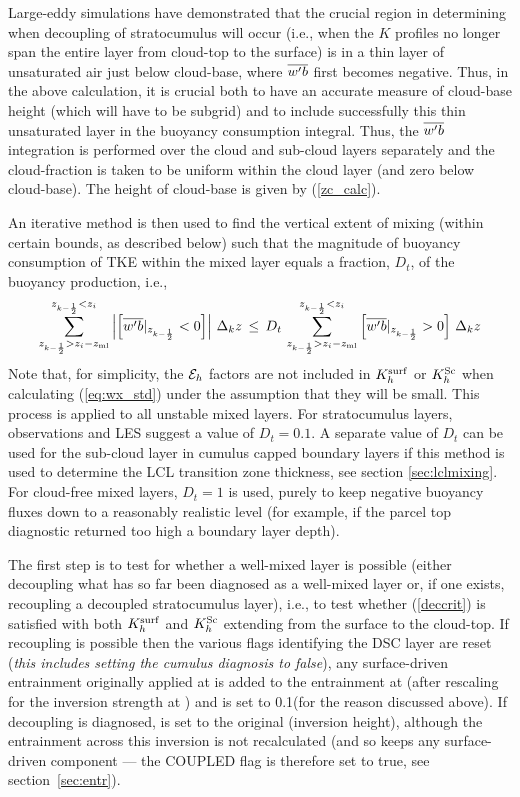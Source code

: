 \documentclass{UMDP_article}
\begin{document}
Large-eddy simulations have demonstrated that the crucial region in
determining when decoupling of stratocumulus will occur (\mbox{i.e.},
when the $K$ profiles no longer span the entire layer from cloud-top
to the surface) is in a thin layer of unsaturated air just below
cloud-base, where $\overline{w'b}$ first becomes negative.  Thus, in the above
calculation, it is crucial both to have an accurate measure of
cloud-base height (which will have to be subgrid) and to include
successfully this thin unsaturated layer in the buoyancy consumption
integral.  Thus, the $\overline{w'b}$ integration is performed over the cloud and
sub-cloud layers separately and the cloud-fraction is taken to be
uniform within the cloud layer (and zero below cloud-base).  The
height of cloud-base is given by (\ref{zc_calc}).

An iterative method is then used to find the vertical extent of mixing
(within certain bounds, as described below) such that the magnitude of
buoyancy consumption of TKE within the mixed layer equals a fraction,
$D_t$, of the buoyancy production, \mbox{i.e.},
\begin{equation}
  \sum_{z_{k-\frac{1}{2}} > z_i-z_{\rm ml}}^{z_{k-\frac{1}{2}} < z_i}
  \left|\left[ \overline{w'b}|_{z_{k-\frac{1}{2}}}<0 \right]\right| \, \Delta_k z \, 
  \leq \, D_t \, 
  \sum_{z_{k-\frac{1}{2}} > z_i-z_{\rm ml}}^{z_{k-\frac{1}{2}} < z_i}
  \left[ \overline{w'b}|_{z_{k-\frac{1}{2}}}>0 \right] \, \Delta_k z
  \label{deccrit}
\end{equation} 
Note that, for simplicity, the ${\cal E}_h$ factors are not included
in $K_h^{\rm surf}$ or $K_h^{\rm Sc}$ when calculating (\ref{eq:wx_std}) under the
assumption that they will be small.  This process is applied to all
unstable mixed layers.  For stratocumulus layers, observations and LES
suggest a value of $D_t=0.1$.  A separate value of $D_t$ can be used for 
the sub-cloud layer in cumulus capped boundary layers if this method is 
used to determine the LCL transition zone thickness, see 
section \ref{sec:lclmixing}.  For cloud-free mixed layers, $D_t=1$ is
used, purely to keep negative buoyancy fluxes down to a reasonably
realistic level (for example, if the parcel top diagnostic returned
too high a boundary layer depth).  

The first step is to test for whether a well-mixed layer is possible
(either decoupling what has so far been diagnosed as a well-mixed
layer or, if one exists, recoupling a decoupled stratocumulus layer),
\mbox{i.e.}, to test whether (\ref{deccrit}) is satisfied with both
$K_h^{\rm surf}$ and $K_h^{\rm Sc}$ extending from the surface to the cloud-top.
If recoupling is possible then the various flags identifying the DSC
layer are reset ({\em this includes setting the cumulus diagnosis to
  false}), any surface-driven entrainment originally applied at \zh is
added to the entrainment at \zhsc (after rescaling for the inversion
strength at \zhsc) and \zbase is set to 0.1\zh (for the reason
discussed above).  If decoupling is diagnosed, \zhsc is set to the
original \zh (inversion height), although the entrainment across this
inversion is not recalculated (and so keeps any surface-driven
component --- the COUPLED flag is therefore set to true, see
section~\ref{sec:entr}).
\end{document}
